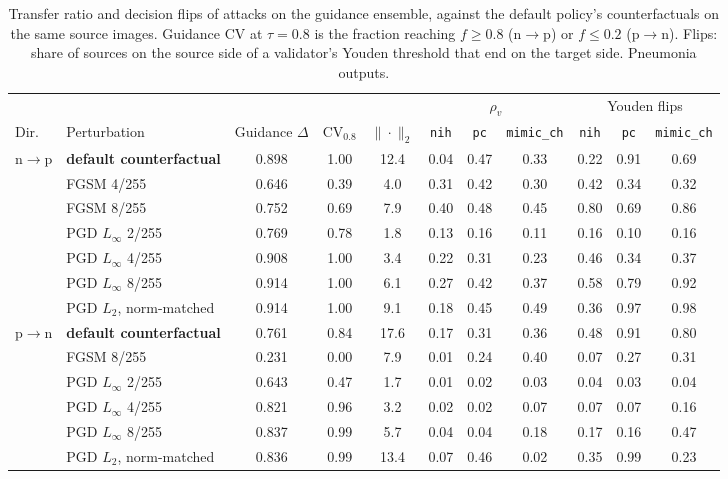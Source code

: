 \begin{table}[t]
\centering
\caption{Transfer ratio and decision flips of attacks on the guidance ensemble, against the default policy's counterfactuals on the same source images. Guidance CV at $\tau=0.8$ is the fraction reaching $f \geq 0.8$ (n$\to$p) or $f \leq 0.2$ (p$\to$n). Flips: share of sources on the source side of a validator's Youden threshold that end on the target side. Pneumonia outputs.}
\label{tab:suppl-attacks}
\footnotesize
\begin{tabular}{@{}llccccccccc@{}}
\toprule
& & & & & \multicolumn{3}{c}{$\rho_v$} & \multicolumn{3}{c}{Youden flips} \\
Dir. & Perturbation & Guidance $\Delta$ & CV$_{0.8}$ & $\|\cdot\|_2$ & \texttt{nih} & \texttt{pc} & \texttt{mimic\_ch} & \texttt{nih} & \texttt{pc} & \texttt{mimic\_ch} \\
\midrule
n$\to$p & \textbf{default counterfactual} & 0.898 & 1.00 & 12.4 & 0.04 & 0.47 & 0.33 & 0.22 & 0.91 & 0.69 \\
& FGSM 4/255 & 0.646 & 0.39 & 4.0 & 0.31 & 0.42 & 0.30 & 0.42 & 0.34 & 0.32 \\
& FGSM 8/255 & 0.752 & 0.69 & 7.9 & 0.40 & 0.48 & 0.45 & 0.80 & 0.69 & 0.86 \\
& PGD $L_\infty$ 2/255 & 0.769 & 0.78 & 1.8 & 0.13 & 0.16 & 0.11 & 0.16 & 0.10 & 0.16 \\
& PGD $L_\infty$ 4/255 & 0.908 & 1.00 & 3.4 & 0.22 & 0.31 & 0.23 & 0.46 & 0.34 & 0.37 \\
& PGD $L_\infty$ 8/255 & 0.914 & 1.00 & 6.1 & 0.27 & 0.42 & 0.37 & 0.58 & 0.79 & 0.92 \\
& PGD $L_2$, norm-matched & 0.914 & 1.00 & 9.1 & 0.18 & 0.45 & 0.49 & 0.36 & 0.97 & 0.98 \\
\midrule
p$\to$n & \textbf{default counterfactual} & 0.761 & 0.84 & 17.6 & 0.17 & 0.31 & 0.36 & 0.48 & 0.91 & 0.80 \\
& FGSM 8/255 & 0.231 & 0.00 & 7.9 & 0.01 & 0.24 & 0.40 & 0.07 & 0.27 & 0.31 \\
& PGD $L_\infty$ 2/255 & 0.643 & 0.47 & 1.7 & 0.01 & 0.02 & 0.03 & 0.04 & 0.03 & 0.04 \\
& PGD $L_\infty$ 4/255 & 0.821 & 0.96 & 3.2 & 0.02 & 0.02 & 0.07 & 0.07 & 0.07 & 0.16 \\
& PGD $L_\infty$ 8/255 & 0.837 & 0.99 & 5.7 & 0.04 & 0.04 & 0.18 & 0.17 & 0.16 & 0.47 \\
& PGD $L_2$, norm-matched & 0.836 & 0.99 & 13.4 & 0.07 & 0.46 & 0.02 & 0.35 & 0.99 & 0.23 \\
\bottomrule
\end{tabular}
\end{table}

